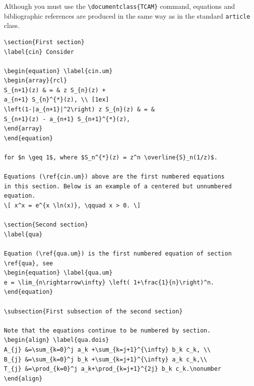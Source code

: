 \documentclass[english]{TCAM} %
\begin{document}
Although you must use the \verb|\documentclass{TCAM}| command, equations and bibliographic references are produced in the same way as in the standard \verb|article| class. 

\begin{framed}
\begin{verbatim}
\section{First section}
\label{cin} Consider

\begin{equation} \label{cin.um}
\begin{array}{rcl}
S_{n+1}(z) & = & z S_{n}(z) +
a_{n+1} S_{n}^{*}(z), \\ [1ex]
\left(1-|a_{n+1}|^2\right) z S_{n}(z) & = &
S_{n+1}(z) - a_{n+1} S_{n+1}^{*}(z),
\end{array}
\end{equation}

for $n \geq 1$, where $S_n^{*}(z) = z^n \overline{S}_n(1/z)$.

Equations (\ref{cin.um}) above are the first numbered equations
in this section. Below is an example of a centered but unnumbered equation.
\[ x^x = e^{x \ln(x)}, \qquad x > 0. \]

\section{Second section}
\label{qua}

Equation (\ref{qua.um}) is the first numbered equation of section
\ref{qua}, see
\begin{equation} \label{qua.um}
e = \lim_{n\rightarrow\infty} \left( 1+\frac{1}{n}\right)^n.
\end{equation}

\subsection{First subsection of the second section}

Note that the equations continue to be numbered by section.
\begin{align} \label{qua.dois}
A_{j} &=\sum_{k=0}^j a_k +\sum_{k=j+1}^{\infty} b_k c_k, \\
B_{j} &=\sum_{k=0}^j b_k +\sum_{k=j+1}^{\infty} a_k c_k,\\
T_{j} &=\prod_{k=0}^j a_k+\prod_{k=j+1}^{2j} b_k c_k.\nonumber
\end{align}
\end{verbatim}
\end{framed}
\end{document}
